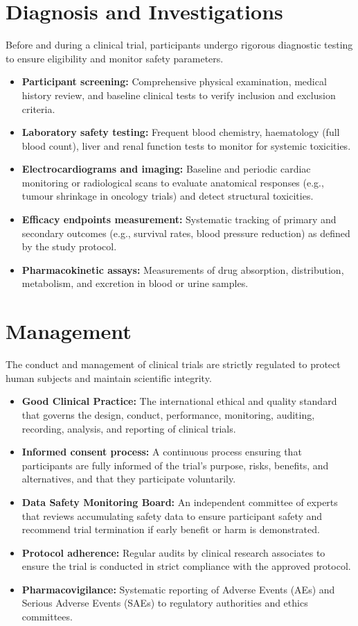 \section*{Diagnosis and Investigations}
Before and during a clinical trial, participants undergo rigorous diagnostic testing to ensure eligibility and monitor safety parameters.
\begin{itemize}
    \item \textbf{Participant screening:} Comprehensive physical examination, medical history review, and baseline clinical tests to verify inclusion and exclusion criteria.
    \item \textbf{Laboratory safety testing:} Frequent blood chemistry, haematology (full blood count), liver and renal function tests to monitor for systemic toxicities.
    \item \textbf{Electrocardiograms and imaging:} Baseline and periodic cardiac monitoring or radiological scans to evaluate anatomical responses (e.g., tumour shrinkage in oncology trials) and detect structural toxicities.
    \item \textbf{Efficacy endpoints measurement:} Systematic tracking of primary and secondary outcomes (e.g., survival rates, blood pressure reduction) as defined by the study protocol.
    \item \textbf{Pharmacokinetic assays:} Measurements of drug absorption, distribution, metabolism, and excretion in blood or urine samples.
\end{itemize}

\section*{Management}
The conduct and management of clinical trials are strictly regulated to protect human subjects and maintain scientific integrity.
\begin{itemize}
    \item \textbf{Good Clinical Practice:} The international ethical and quality standard that governs the design, conduct, performance, monitoring, auditing, recording, analysis, and reporting of clinical trials.
    \item \textbf{Informed consent process:} A continuous process ensuring that participants are fully informed of the trial's purpose, risks, benefits, and alternatives, and that they participate voluntarily.
    \item \textbf{Data Safety Monitoring Board:} An independent committee of experts that reviews accumulating safety data to ensure participant safety and recommend trial termination if early benefit or harm is demonstrated.
    \item \textbf{Protocol adherence:} Regular audits by clinical research associates to ensure the trial is conducted in strict compliance with the approved protocol.
    \item \textbf{Pharmacovigilance:} Systematic reporting of Adverse Events (AEs) and Serious Adverse Events (SAEs) to regulatory authorities and ethics committees.
\end{itemize}

